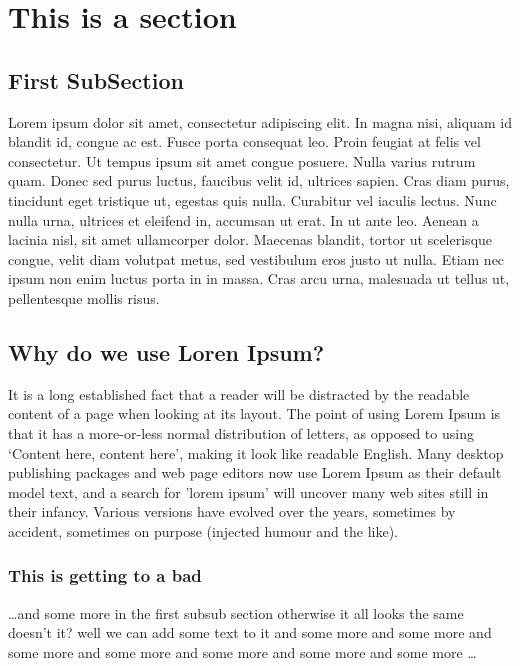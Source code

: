 \documentclass[11pt]{article}
\begin{document}
\normalsize

\section{This is a section} %

\subsection{First SubSection} %

Lorem ipsum dolor sit amet, consectetur adipiscing elit. In magna nisi, aliquam 
id blandit id, congue ac est. Fusce porta consequat leo. Proin feugiat at felis 
vel consectetur. Ut tempus ipsum sit amet congue posuere. Nulla varius rutrum 
quam. Donec sed purus luctus, faucibus velit id, ultrices sapien. Cras diam 
purus, tincidunt eget tristique ut, egestas quis nulla. Curabitur vel iaculis 
lectus. Nunc nulla urna, ultrices et eleifend in, accumsan ut erat. In ut ante 
leo. Aenean a lacinia nisl, sit amet ullamcorper dolor. Maecenas blandit, 
tortor ut scelerisque congue, velit diam volutpat metus, sed vestibulum eros 
justo ut nulla. Etiam nec ipsum non enim luctus porta in in massa. Cras arcu 
urna, malesuada ut tellus ut, pellentesque mollis risus.


\subsection{Why do we use Loren Ipsum?} %

It is a long established fact that a reader will be distracted by the readable 
content of a page when looking at its layout. The point of using Lorem Ipsum is 
that it has a more-or-less normal distribution of letters, as opposed to using 
`Content here, content here', making it look like readable English. Many 
desktop publishing packages and web page editors now use Lorem Ipsum as their 
default model text, and a search for 'lorem ipsum' will uncover many web sites 
still in their infancy. Various versions have evolved over the years, sometimes 
by accident, sometimes on purpose (injected humour and the like).


\subsubsection{This is getting to a bad} %
\dots and some more in the first subsub section otherwise it all looks the same
doesn't it? well we can add some text to it and some more and some more and
some more and some more and some more and some more and some more \dots
\end{document}
